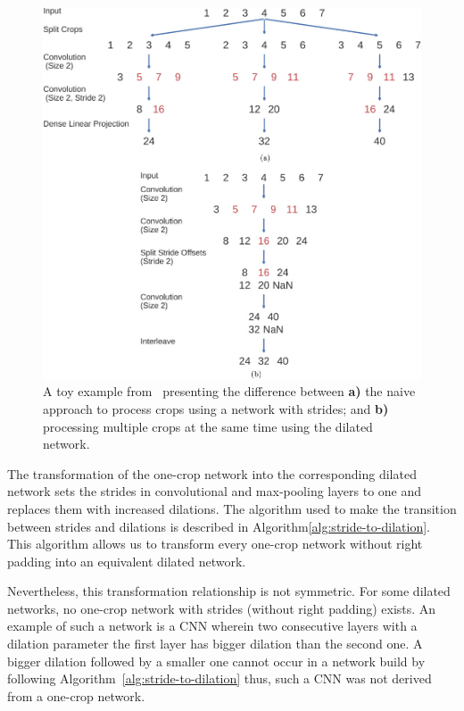 \begin{figure}[!htbp]
\centering
\includegraphics[width=\linewidth]{img/ch3/cropped-decoding-scheme}
\caption[Processing crops]{A toy example from~\cite{schirrmeister-deep-2017} presenting the difference between \textbf{a)} the naive approach to process crops using a network with strides; and \textbf{b)} processing multiple crops at the same time using the dilated network.}
\label{fig:cropped-decoding-scheme}
\end{figure}

The transformation of the one-crop network into the corresponding dilated network sets the strides in convolutional and max-pooling layers to one and replaces them with increased dilations.
The algorithm used to make the transition between strides and dilations is described in Algorithm\ref{alg:stride-to-dilation}. This algorithm allows us to transform every one-crop network without right padding into an equivalent dilated network.

Nevertheless, this transformation relationship is not symmetric.
For some dilated networks, no one-crop network with strides (without right padding) exists.
An example of such a network is a CNN wherein two consecutive layers with a dilation parameter the first layer has bigger dilation than the second one.
A bigger dilation followed by a smaller one cannot occur in a network build by following Algorithm~\ref{alg:stride-to-dilation} thus, such a CNN was not derived from a one-crop network.


